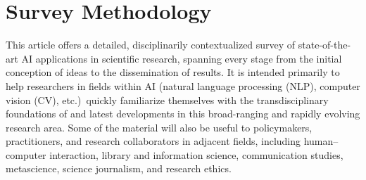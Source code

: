 \section{Survey Methodology}\label{sec:methodology}






This article offers a detailed, disciplinarily contextualized survey of state-of-the-art AI applications in scientific research, spanning every stage from the initial conception of ideas to the dissemination of results.  It is intended primarily to help researchers in fields within AI (natural language processing (NLP), computer vision (CV), etc.)\ quickly familiarize themselves with the transdisciplinary foundations of and latest developments in this broad-ranging and rapidly evolving research area.  Some of the material will also be useful to  policymakers, practitioners, and research collaborators in adjacent fields, including human--computer interaction, library and information science, communication studies, metascience, science journalism, and research ethics.  

